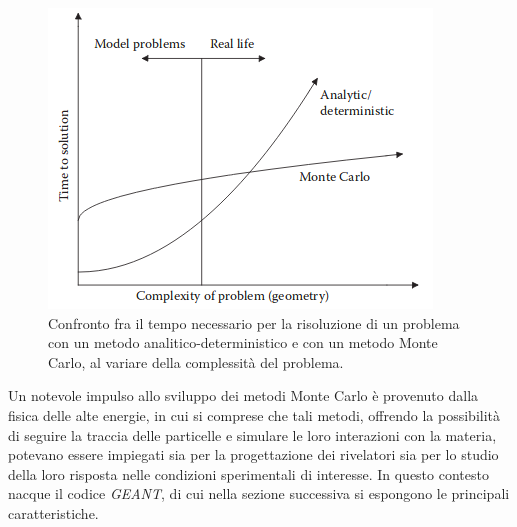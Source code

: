 \begin{figure} [!t]
	\centering
	\includegraphics[scale=0.75]{Grafici/monte_carlo_vs_analytic2.png}
	\caption{Confronto fra il tempo necessario per la risoluzione di un problema con un metodo analitico-deterministico e con un metodo Monte Carlo, al variare della complessità del problema.} \label{fig:monte_carlo}
\end{figure}




%
%
Un notevole impulso allo sviluppo dei metodi Monte Carlo è provenuto dalla fisica delle alte energie, in cui si comprese che tali metodi, offrendo la possibilità di seguire la traccia delle particelle e simulare le loro interazioni con la materia, potevano essere impiegati sia per la progettazione dei rivelatori sia per lo studio della loro risposta nelle condizioni sperimentali di interesse.
In questo contesto nacque il codice \emph{GEANT}, di cui nella sezione successiva si espongono le principali caratteristiche.





